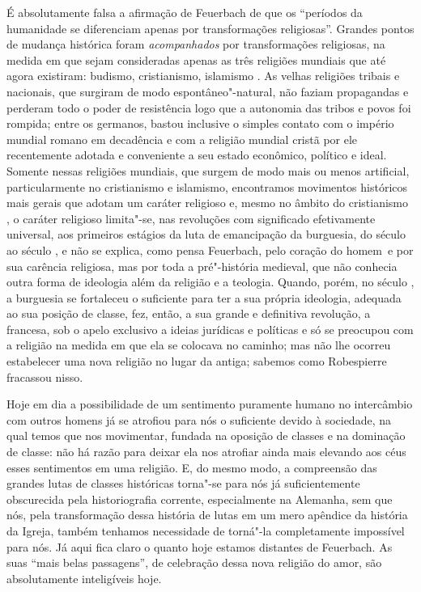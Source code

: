 É absolutamente falsa a afirmação
de Feuerbach
de que os ``períodos da humanidade se diferenciam apenas por
transformações religiosas''. \textbar{} Grandes pontos de mudança histórica
foram \emph{acompanhados }por transformações religiosas, na medida em
que sejam consideradas apenas as três religiões mundiais que até agora
existiram: budismo, cristianismo, islamismo \textbar{}. As velhas religiões
tribais e nacionais, que surgiram de modo espontâneo"-natural, \textbar{} não
faziam propagandas e perderam \textbar{} todo o poder de resistência logo que a
autonomia das tribos e povos foi rompida; entre os germanos, bastou
inclusive o simples contato com o império mundial romano em decadência e
com a religião mundial cristã por ele recentemente adotada e conveniente
a seu estado econômico, político e ideal. Somente nessas religiões
mundiais, que surgem de modo mais ou menos artificial, particularmente
no cristianismo e islamismo, encontramos movimentos históricos mais
gerais que adotam um caráter religioso e, \textbar{} mesmo no âmbito do
cristianismo \textbar{}, o caráter religioso limita"-se, nas revoluções com
significado efetivamente universal, aos primeiros estágios da luta de
emancipação da burguesia, do século  ao século , e não se
explica, como pensa
Feuerbach,
pelo coração do homem\est\ e por sua carência religiosa, mas por toda a
pré"-história medieval, que não conhecia outra forma de ideologia além da
religião e a teologia. Quando, porém, no século , a burguesia se
fortaleceu o suficiente para ter a sua própria ideologia, adequada ao
sua posição de classe, fez, então, a sua grande e definitiva revolução,
a francesa, sob o apelo exclusivo a ideias jurídicas e políticas e só se
preocupou com a religião na medida em que ela se colocava no caminho;
mas não lhe ocorreu estabelecer uma nova religião no lugar da antiga; \textbar{}
sabemos como Robespierre fracassou nisso. \textbar{}

Hoje em dia a possibilidade de um sentimento puramente humano no
intercâmbio com outros homens já se atrofiou para nós o suficiente
devido à sociedade, na qual temos que nos movimentar, fundada na
oposição de classes e na dominação de classe: não há razão para deixar
ela nos atrofiar ainda mais elevando aos céus esses sentimentos em uma
religião. E, do mesmo modo, a compreensão das grandes lutas de classes
históricas torna"-se para nós já suficientemente obscurecida pela
historiografia corrente, especialmente na Alemanha, sem que nós, pela
transformação dessa história de lutas em um mero apêndice da história da
Igreja, também tenhamos necessidade de torná"-la completamente impossível
para nós. Já aqui fica claro o quanto hoje estamos distantes
de Feuerbach.
As suas ``mais belas passagens'', de celebração dessa nova religião do
amor, são absolutamente inteligíveis hoje.

